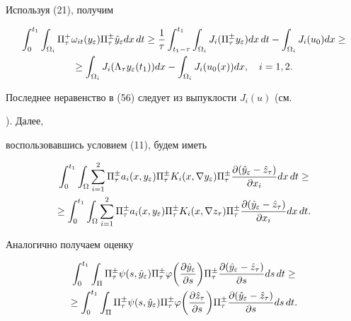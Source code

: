 Используя (21), получим 


\begin{gather} 


\int_0^{t_1}\int_{\Omega_i}\Pi^+_\tau \omega_{it}(y_\varepsilon) 


\Pi^\pm_\tau \Hat y_\varepsilon dx\,dt \ge 


\frac{1}{\tau}\int^{t_1}_{t_1-\tau}\int_{\Omega_i}J_i(\Pi^\pm_\tau 


y_\varepsilon)dx\,dt - \int_{\Omega_i}J_i(u_0)dx \ge \notag \\ 


\ge \int_{\Omega_i}J_i(\Lambda_\tau y_\varepsilon(t_1))dx - 


\int_{\Omega_i}J_i(u_0(x))dx, \quad i=1,2. 


\end{gather} 


Последнее неравенство в (56) следует из выпуклости $J_i(u)$ (см. 


\cite{Lio}). Далее, 


воспользовавшись условием (11), будем иметь 


\begin{gather} 


\int_0^{t_1}\int_\Omega\sum^2_{i=1}\Pi^\pm_\tau a_i(x,y_\varepsilon)


\Pi^\pm_\tau K_i(x,\nabla y_\varepsilon)\Pi^\pm_\tau 


\frac{\partial(\Hat y_\varepsilon -\Hat z_\tau)}{\partial x_i} dx\,dt \ge 


\notag \\


\ge \int_0^{t_1}\int_\Omega\sum^2_{i=1}\Pi^\pm_\tau a_i(x,y_\varepsilon)


\Pi^\pm_\tau K_i(x,\nabla z_\tau)\Pi^\pm_\tau 


\frac{\partial(\Hat y_\varepsilon -\Hat z_\tau)}{\partial x_i} dx\,dt.


\end{gather} 


Аналогично получаем оценку 


\begin{gather} 


\int_0^{t_1}\int_\Pi\Pi^\pm_\tau \psi(s,\Hat y_\varepsilon)


\Pi^\pm_\tau \varphi \biggl(\frac{\partial \Hat y_\varepsilon} 


{\partial s}\biggr)\Pi^\pm_\tau 


\frac{\partial(\Hat y_\varepsilon -\Hat z_\tau)}{\partial s} ds\,dt \ge 


\notag\\


\ge\int_0^{t_1}\int_\Pi\Pi^\pm_\tau \psi(s,\Hat y_\varepsilon)


\Pi^\pm_\tau \varphi\biggl(\frac{\partial \Hat z_\tau}{\partial s} \biggr)


\Pi^\pm_\tau 


\frac{\partial(\Hat y_\varepsilon -\Hat z_\tau)}{\partial s} ds\,dt.


\end{gather} 


